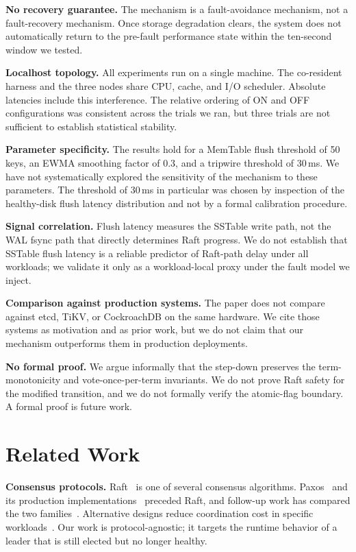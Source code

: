 \documentclass[conference, a4paper]{IEEEtran}
\begin{document}
\textbf{No recovery guarantee.} The mechanism is a fault-avoidance
mechanism, not a fault-recovery mechanism. Once storage degradation
clears, the system does not automatically return to the pre-fault
performance state within the ten-second window we tested.

\textbf{Localhost topology.} All experiments run on a single machine.
The co-resident harness and the three nodes share CPU, cache, and I/O
scheduler. Absolute latencies include this interference. The relative
ordering of ON and OFF configurations was consistent across the trials
we ran, but three trials are not sufficient to establish statistical
stability.

\textbf{Parameter specificity.} The results hold for a MemTable flush
threshold of 50 keys, an EWMA smoothing factor of 0.3, and a tripwire
threshold of 30\,ms. We have not systematically explored the sensitivity
of the mechanism to these parameters. The threshold of 30\,ms in
particular was chosen by inspection of the healthy-disk flush latency
distribution and not by a formal calibration procedure.

\textbf{Signal correlation.} Flush latency measures the SSTable write
path, not the WAL fsync path that directly determines Raft progress.
We do not establish that SSTable flush latency is a reliable predictor
of Raft-path delay under all workloads; we validate it only as a
workload-local proxy under the fault model we inject.

\textbf{Comparison against production systems.} The paper does not
compare against etcd, TiKV, or CockroachDB on the same hardware. We
cite those systems as motivation and as prior work, but we do not claim
that our mechanism outperforms them in production deployments.

\textbf{No formal proof.} We argue informally that the step-down
preserves the term-monotonicity and vote-once-per-term invariants. We
do not prove Raft safety for the modified transition, and we do not
formally verify the atomic-flag boundary. A formal proof is future work.

\section{Related Work}

\textbf{Consensus protocols.} Raft~\cite{raft} is one of several
consensus algorithms. Paxos~\cite{lamport_paxos,lamport_part_time} and
its production implementations~\cite{chandra_paxos_live} preceded Raft,
and follow-up work has compared the two
families~\cite{howard_refloated,howard_paxos_vs_raft}. Alternative
designs reduce coordination cost in specific
workloads~\cite{moraru_epaxos,mao_paxos_transparent}. Our work is
protocol-agnostic; it targets the runtime behavior of a leader that is
still elected but no longer healthy.
\end{document}
